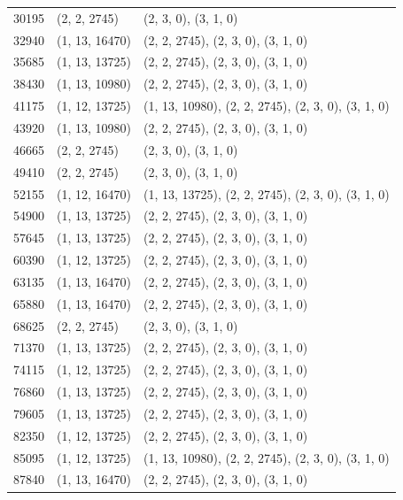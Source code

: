 \begin{longtable}{@{\extracolsep{\fill}}lll}
30195  & (2, 2, 2745)   & (2, 3, 0), (3, 1, 0)                                \\
32940  & (1, 13, 16470) & (2, 2, 2745), (2, 3, 0), (3, 1, 0)                  \\
35685  & (1, 13, 13725) & (2, 2, 2745), (2, 3, 0), (3, 1, 0)                  \\
38430  & (1, 13, 10980) & (2, 2, 2745), (2, 3, 0), (3, 1, 0)                  \\
41175  & (1, 12, 13725) & (1, 13, 10980), (2, 2, 2745), (2, 3, 0), (3, 1, 0)  \\
43920  & (1, 13, 10980) & (2, 2, 2745), (2, 3, 0), (3, 1, 0)                  \\
46665  & (2, 2, 2745)   & (2, 3, 0), (3, 1, 0)                                \\
49410  & (2, 2, 2745)   & (2, 3, 0), (3, 1, 0)                                \\
52155  & (1, 12, 16470) & (1, 13, 13725), (2, 2, 2745), (2, 3, 0), (3, 1, 0)  \\
54900  & (1, 13, 13725) & (2, 2, 2745), (2, 3, 0), (3, 1, 0)                  \\
57645  & (1, 13, 13725) & (2, 2, 2745), (2, 3, 0), (3, 1, 0)                  \\
60390  & (1, 12, 13725) & (2, 2, 2745), (2, 3, 0), (3, 1, 0)                  \\
63135  & (1, 13, 16470) & (2, 2, 2745), (2, 3, 0), (3, 1, 0)                  \\
65880  & (1, 13, 16470) & (2, 2, 2745), (2, 3, 0), (3, 1, 0)                  \\
68625  & (2, 2, 2745)   & (2, 3, 0), (3, 1, 0)                                \\
71370  & (1, 13, 13725) & (2, 2, 2745), (2, 3, 0), (3, 1, 0)                  \\
74115  & (1, 12, 13725) & (2, 2, 2745), (2, 3, 0), (3, 1, 0)                  \\
76860  & (1, 13, 13725) & (2, 2, 2745), (2, 3, 0), (3, 1, 0)                  \\
79605  & (1, 13, 13725) & (2, 2, 2745), (2, 3, 0), (3, 1, 0)                  \\
82350  & (1, 12, 13725) & (2, 2, 2745), (2, 3, 0), (3, 1, 0)                  \\
85095  & (1, 12, 13725) & (1, 13, 10980), (2, 2, 2745), (2, 3, 0), (3, 1, 0)  \\
87840  & (1, 13, 16470) & (2, 2, 2745), (2, 3, 0), (3, 1, 0)                  \\

\end{longtable}
